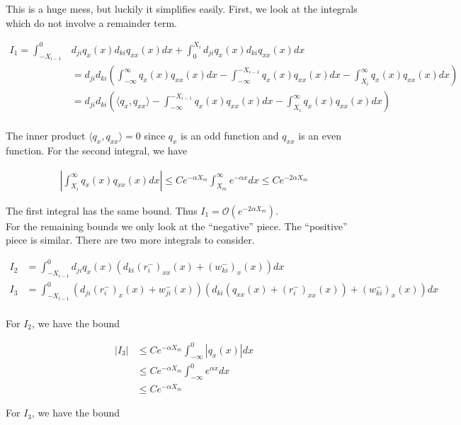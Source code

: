 \documentclass[12pt]{article}
\begin{document}
This is a huge mess, but luckily it simplifies easily. First, we look at the integrals which do not involve a remainder term.

\begin{align*}
I_1 = \int_{-X_{i-1}}^0 &d_{ji} q_x(x) d_{ki}q_{xx}(x)dx + \int_0^{X_i} d_{ji} q_x(x) d_{ki}q_{xx}(x)dx \\
&= d_{ji} d_{ki} \left( \int_{-\infty}^\infty q_x(x) q_{xx}(x) dx - \int_{-\infty}^{-X_{i-1}} q_x(x) q_{xx}(x)dx - \int_{X_i}^\infty q_x(x) q_{xx}(x)dx \right) \\
&= d_{ji} d_{ki} \left( \langle q_x, q_{xx} \rangle - \int_{-\infty}^{-X_{i-1}} q_x(x) q_{xx}(x)dx - \int_{X_i}^\infty q_x(x) q_{xx}(x)dx \right) \\
\end{align*}

The inner product $\langle q_x, q_{xx} \rangle = 0$ since $q_x$ is an odd function and $q_{xx}$ is an even function. For the second integral, we have

\begin{align*}
\left| \int_{X_i}^\infty q_x(x) q_{xx}(x)dx \right| 
\leq C e^{-\alpha X_m} \int_{X_m}^\infty e^{-\alpha x} dx \leq C e^{-2 \alpha X_m}
\end{align*}

The first integral has the same bound. Thus $I_1 = \mathcal{O}(e^{-2 \alpha X_m})$.\\

For the remaining bounds we only look at the ``negative'' piece. The ``positive'' piece is similar. There are two more integrals to consider.

\begin{align*}
I_2 &= \int_{-X_{i-1}}^0 d_{ji} q_x(x)(d_{ki}(r_i^-)_{xx}(x) + (w_{ki}^-)_x(x)) dx \\
I_3 &= \int_{-X_{i-1}}^0 (d_{ji}(r_i^-)_x(x) + w_{ji}^-(x))(d_{ki}(q_{xx}(x) + (r_i^-)_{xx}(x)) + (w_{ki}^-)_x(x)) dx \\
\end{align*}

For $I_2$, we have the bound

\begin{align*}
|I_3| &\leq C e^{-\alpha X_m} \int_{-\infty}^0 |q_x(x)| dx \\
&\leq C e^{-\alpha X_m} \int_{-\infty}^0 e^{\alpha x} dx \\
&\leq C e^{-\alpha X_m} 
\end{align*}

For $I_3$, we have the bound
\end{document}
